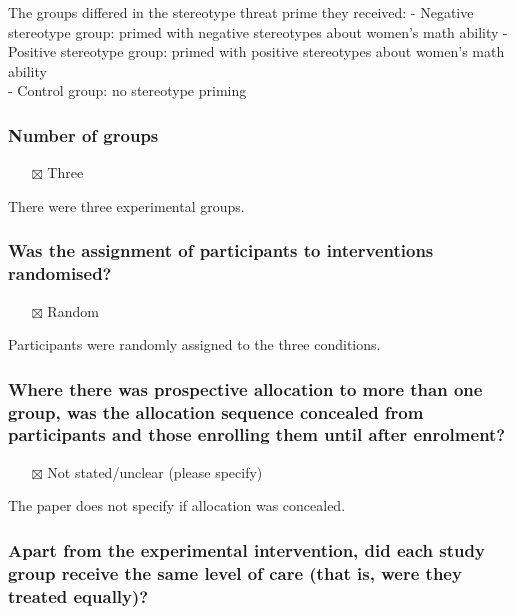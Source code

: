 \documentclass[
  doc, a4paper]{apa7}
\providecommand{\tightlist}{%
  \setlength{\itemsep}{0pt}\setlength{\parskip}{0pt}}
\begin{document}
The groups differed in the stereotype threat prime they received:
- Negative stereotype group: primed with negative stereotypes about women's math ability
- Positive stereotype group: primed with positive stereotypes about women's math ability\\
- Control group: no stereotype priming

\subsubsection{Number of groups}\label{number-of-groups}

\begin{itemize}
\tightlist
\item[$\boxtimes$]
  Three
\end{itemize}

There were three experimental groups.

\subsubsection{Was the assignment of participants to interventions randomised?}\label{was-the-assignment-of-participants-to-interventions-randomised}

\begin{itemize}
\tightlist
\item[$\boxtimes$]
  Random
\end{itemize}

Participants were randomly assigned to the three conditions.

\subsubsection{Where there was prospective allocation to more than one group, was the allocation sequence concealed from participants and those enrolling them until after enrolment?}\label{where-there-was-prospective-allocation-to-more-than-one-group-was-the-allocation-sequence-concealed-from-participants-and-those-enrolling-them-until-after-enrolment}

\begin{itemize}
\tightlist
\item[$\boxtimes$]
  Not stated/unclear (please specify)
\end{itemize}

The paper does not specify if allocation was concealed.

\subsubsection{Apart from the experimental intervention, did each study group receive the same level of care (that is, were they treated equally)?}\label{apart-from-the-experimental-intervention-did-each-study-group-receive-the-same-level-of-care-that-is-were-they-treated-equally}
\end{document}
